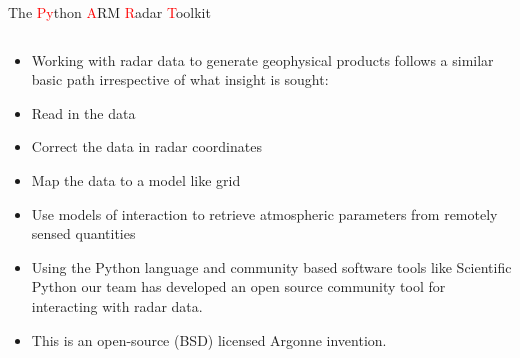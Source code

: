 \documentclass[final]{beamer}
\begin{document}
\begin{frame}{}
\begin{columns}[t]
\begin{column}{.3\linewidth}
         
        \begin{block}{The \textcolor{red}{Py}thon \textcolor{red}{A}RM \textcolor{red}{R}adar \textcolor{red}{T}oolkit}
                \begin{columns}[t]
                    \begin{column}{.6\linewidth}
                        \begin{itemize}
                            \item Working with radar data to generate geophysical products follows a similar basic path irrespective of what insight is sought:
			   \item Read in the data
                            \item  Correct the data in radar coordinates
                            \item  Map the data to a model like grid
                            \item  Use models of interaction to retrieve atmospheric parameters from remotely sensed quantities
                            \item  Using the Python language and community based software tools like Scientific 
                            Python our team has developed an open source community tool for interacting with radar data. 
                            \item  This is an open-source (BSD) licensed Argonne invention.
                       \end{itemize}
                   \end{column}
\end{columns}
\end{block}
\end{column}
\end{columns}
\end{frame}
\end{document}
